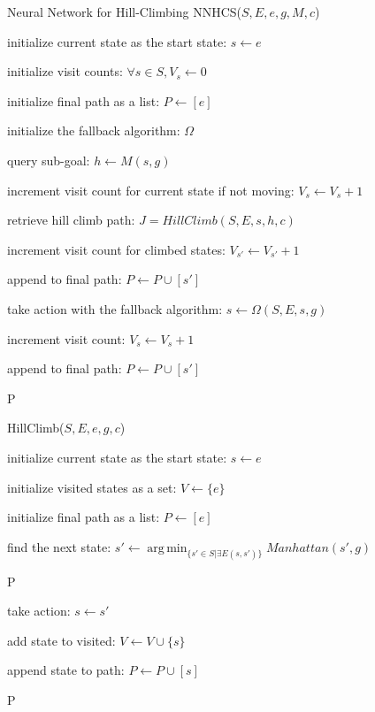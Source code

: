 \documentclass[letterpaper]{article}
\numberwithin{equation}{section}
\numberwithin{theorem}{section}
\numberwithin{lemma}{section}
\numberwithin{df}{section}
\DeclareMathOperator*{\argmin}{arg\,min}
\begin{document}
    \begin{algorithm*}
        \DontPrintSemicolon
        \label{alg:nnhcs}
        \caption{Neural Network for Hill-Climbing NNHCS($S, E, e, g, M, c$)}

        initialize current state as the start state: $s \leftarrow e$

        initialize visit counts: $\forall s \in S, V_s \leftarrow 0$

        initialize final path as a list: $P \leftarrow [e] $

        initialize the fallback algorithm: $\Omega$

        {
            {

                query sub-goal: $h \leftarrow M(s, g) $

                {
                    increment visit count for current state if not moving: $V_s \leftarrow V_s + 1$
                }

                retrieve hill climb path: $J = \mathit{HillClimb}(S, E, s, h, c)$

                {
                    increment visit count for climbed states: $V_{s'} \leftarrow V_{s'} + 1$

                    append to final path: $P \leftarrow P \cup [s'] $
                }

            }
            \Else
            {
                take action with the fallback algorithm: $s \leftarrow \Omega(S, E, s, g) $

                increment visit count: $V_{s} \leftarrow V_{s} + 1$

                append to final path: $P \leftarrow P \cup [s'] $
            }

        }

        \Return P

    \end{algorithm*}

    \begin{algorithm*}
        \DontPrintSemicolon
        \label{alg:hill_climb}
        \caption{HillClimb($S, E, e, g, c$)}

        initialize current state as the start state: $s \leftarrow e$

        initialize visited states as a set: $V \leftarrow \{e\}$

        initialize final path as a list: $P \leftarrow [e]$

        {
            find the next state: $s' \leftarrow \argmin_{\{s' \in S | \exists E(s, s') \}} \mathit{Manhattan}(s', g) $

            {
                \Return P
            }
            \Else
            {
                take action: $s \leftarrow s' $

                add state to visited: $V \leftarrow V \cup \{s\} $

                append state to path: $P \leftarrow P \cup [s] $
            }
        }
        \Return P
    \end{algorithm*}
\end{document}

